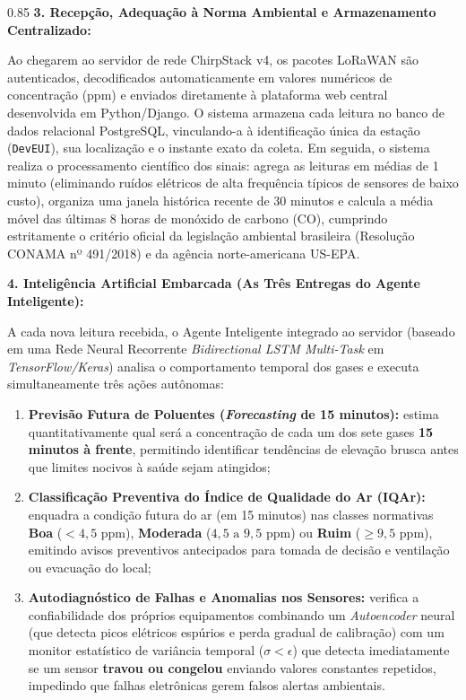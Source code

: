 \documentclass[11pt, a4paper]{article}
\begin{document}
\begin{spacing}{0.85}
\vspace{0.04cm}
\noindent\textbf{3. Recepção, Adequação à Norma Ambiental e Armazenamento Centralizado:}\par
Ao chegarem ao servidor de rede ChirpStack v4, 
os pacotes LoRaWAN são autenticados, decodificados automaticamente em 
valores numéricos de concentração (ppm) e enviados diretamente à plataforma web central 
desenvolvida em Python/Django. O sistema armazena cada leitura no banco de dados 
relacional PostgreSQL, vinculando-a à identificação única da estação (\texttt{DevEUI}), 
sua localização e o instante exato da coleta. Em seguida, o sistema realiza o processamento 
científico dos sinais: agrega as leituras em médias de 1 minuto (eliminando ruídos 
elétricos de alta frequência típicos de sensores de baixo custo), organiza uma janela histórica 
recente de 30 minutos e calcula a 
média móvel das últimas 8 horas de monóxido de carbono (CO), 
cumprindo estritamente o critério oficial da legislação ambiental brasileira 
(Resolução CONAMA nº 491/2018) e da agência norte-americana US-EPA.

\vspace{0.04cm}
\noindent\textbf{4. Inteligência Artificial Embarcada (As Três Entregas do Agente Inteligente):}\par
A cada nova leitura recebida, o Agente Inteligente integrado ao servidor 
(baseado em uma Rede Neural Recorrente \emph{Bidirectional LSTM Multi-Task} em \emph{TensorFlow/Keras}) 
analisa o comportamento temporal dos gases e executa simultaneamente três ações autônomas:
\begin{enumerate}[nosep, leftmargin=1.4cm, topsep=0.02cm]
    \item \textbf{Previsão Futura de Poluentes (\emph{Forecasting} de 15 minutos):} estima quantitativamente qual será a concentração de cada um dos sete gases \textbf{15 minutos à frente}, permitindo identificar tendências de elevação brusca antes que limites nocivos à saúde sejam atingidos;
    \item \textbf{Classificação Preventiva do Índice de Qualidade do Ar (IQAr):} enquadra a condição futura do ar (em 15 minutos) nas classes normativas \textbf{Boa} ($< 4{,}5\textrm{ ppm}$), \textbf{Moderada} ($4{,}5\textrm{ a }9{,}5\textrm{ ppm}$) ou \textbf{Ruim} ($\ge 9{,}5\textrm{ ppm}$), emitindo avisos preventivos antecipados para tomada de decisão e ventilação ou evacuação do local;
    \item \textbf{Autodiagnóstico de Falhas e Anomalias nos Sensores:} verifica a confiabilidade dos próprios equipamentos combinando um \emph{Autoencoder} neural (que detecta picos elétricos espúrios e perda gradual de calibração) com um monitor estatístico de variância temporal ($\sigma < \epsilon$) que detecta imediatamente se um sensor \textbf{travou ou congelou} enviando valores constantes repetidos, impedindo que falhas eletrônicas gerem falsos alertas ambientais.
\end{enumerate}


\end{spacing}
\end{document}
